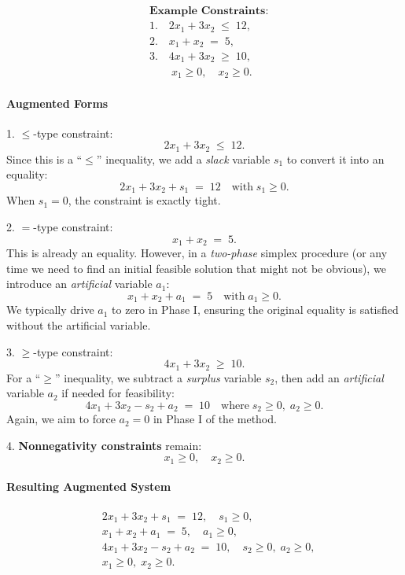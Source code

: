 \[
\begin{aligned}
&\textbf{Example Constraints:}\\
&1.\quad 2x_{1} + 3x_{2} \;\le\; 12,\\
&2.\quad x_{1} + x_{2} \;=\; 5,\\
&3.\quad 4x_{1} + 3x_{2} \;\ge\; 10,\\
&\qquad x_{1} \ge 0,\quad x_{2} \ge 0.
\end{aligned}
\]

\paragraph{Augmented Forms}

1. \(\boldsymbol{\le}\)-type constraint:
\[
   2x_{1} + 3x_{2} \;\le\; 12.
\]
Since this is a ``\(\le\)'' inequality, we add a \emph{slack} variable \(s_{1}\) to convert it into an equality:
\[
   2x_{1} + 3x_{2} + s_{1} \;=\; 12
   \quad \text{with} \; s_{1} \ge 0.
\]
When \(s_{1} = 0\), the constraint is exactly tight.

2. \(\boldsymbol{=}\)-type constraint:
\[
   x_{1} + x_{2} \;=\; 5.
\]
This is already an equality. However, in a \emph{two-phase} simplex procedure (or any time we need to find an initial feasible solution that might not be obvious), we introduce an \emph{artificial} variable \(a_{1}\):
\[
   x_{1} + x_{2} + a_{1} \;=\; 5 
   \quad \text{with} \; a_{1} \ge 0.
\]
We typically drive \(a_{1}\) to zero in Phase I, ensuring the original equality is satisfied without the artificial variable.

3. \(\boldsymbol{\ge}\)-type constraint:
\[
   4x_{1} + 3x_{2} \;\ge\; 10.
\]
For a ``\(\ge\)'' inequality, we subtract a \emph{surplus} variable \(s_{2}\), then add an \emph{artificial} variable \(a_{2}\) if needed for feasibility:
\[
   4x_{1} + 3x_{2} - s_{2} + a_{2} \;=\; 10
   \quad \text{where} \; s_{2} \ge 0,\; a_{2} \ge 0.
\]
Again, we aim to force \(a_{2} = 0\) in Phase I of the method.

4. \textbf{Nonnegativity constraints} remain:
\[
   x_{1} \ge 0,\quad x_{2} \ge 0.
\]

\paragraph{Resulting Augmented System}

\[
\begin{aligned}
&2x_{1} + 3x_{2} + s_{1} \;=\; 12, 
   \quad s_{1} \ge 0,\\
&x_{1} + x_{2} + a_{1} \;=\; 5, 
   \quad a_{1} \ge 0,\\
&4x_{1} + 3x_{2} - s_{2} + a_{2} \;=\; 10, 
   \quad s_{2} \ge 0,\; a_{2} \ge 0,\\
&x_{1} \ge 0,\; x_{2} \ge 0.
\end{aligned}
\]



